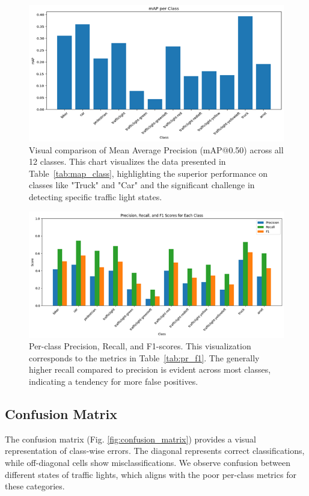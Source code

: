 \documentclass[10pt, conference]{IEEEtran}
\begin{document}
\begin{figure}[htbp]
    \centering
    \includegraphics[width=\linewidth]{images/map_per_class.png}
    \caption{Visual comparison of Mean Average Precision (mAP@0.50) across all 12 classes. This chart visualizes the data presented in Table~\ref{tab:map_class}, highlighting the superior performance on classes like "Truck" and "Car" and the significant challenge in detecting specific traffic light states.}
    \label{fig:map_per_class}
\end{figure}

\begin{figure}[htbp]
    \centering
    \includegraphics[width=\linewidth]{images/precision_recall_f1_perclass.png}
    \caption{Per-class Precision, Recall, and F1-scores. This visualization corresponds to the metrics in Table~\ref{tab:pr_f1}. The generally higher recall compared to precision is evident across most classes, indicating a tendency for more false positives.}
    \label{fig:prf1_per_class}
\end{figure}

\subsection{Confusion Matrix}
The confusion matrix (Fig. \ref{fig:confusion_matrix}) provides a visual representation of class-wise errors. The diagonal represents correct classifications, while off-diagonal cells show misclassifications. We observe confusion between different states of traffic lights, which aligns with the poor per-class metrics for these categories.
\end{document}
